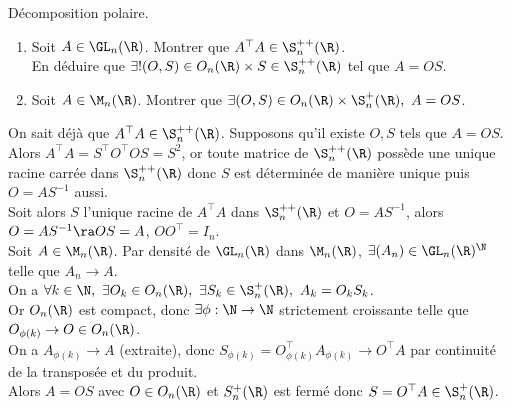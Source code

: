 \documentclass[11pt]{article}
\begin{document}
\begin{exercice}{Décomposition polaire.}{}
    \begin{enumerate}
        \item Soit $A\in\GL_n(\R)$. Montrer que $A^\top A\in\S_n^{++}(\R)$.\\
        En déduire que $\exists!(O,S)\in O_n(\R)\times S\in\S_n^{++}(\R)$ tel que $A=OS$.
        \item Soit $A\in\M_n(\R)$. Montrer que $\exists (O,S)\in O_n(\R)\times \S_n^+(\R), ~ A=OS$. 
    \end{enumerate}
    \tcblower 
     On sait déjà que $A^\top A \in \S_n^{++}(\R)$. Supposons qu'il existe $O,S$ tels que $A=OS$.\\
    Alors $A^\top A = S^\top O^\top O S = S^2$, or toute matrice de $\S_n^{++}(\R)$ possède une unique racine carrée dans $\S_n^{++}(\R)$ donc $S$ est déterminée de manière unique puis $O=AS^{-1}$ aussi.\\
    Soit alors $S$ l'unique racine de $A^\top A$ dans $\S_n^{++}(\R)$ et $O=AS^{-1}$, alors $O=AS^{-1}\ra OS=A$, $OO^\top = I_n$.\\
     Soit $A\in\M_n(\R)$. Par densité de $\GL_n(\R)$ dans $\M_n(\R)$, $\exists (A_n)\in\GL_n(\R)^\N$ telle que $A_n\to A$.\\
    On a $\forall k \in \N, ~ \exists O_k \in O_n(\R), ~ \exists S_k \in \S_n^{+}(\R), ~ A_k = O_kS_k$.\\
    Or $O_n(\R)$ est compact, donc $\exists \phi : \N\to \N$ strictement croissante telle que $O_{\phi(k)}\to O\in O_n(\R)$.\\
    On a $A_{\phi(k)}\to A$ (extraite), donc $S_{\phi(k)}=O^\top_{\phi(k)}A_{\phi(k)}\to O^\top A$ par continuité de la transposée et du produit.\\
    Alors $A=OS$ avec $O\in O_n(\R)$ et $S_n^{+}(\R)$ est fermé donc $S=O^\top A\in\S_n^{+}(\R)$.
\end{exercice}
\end{document}
